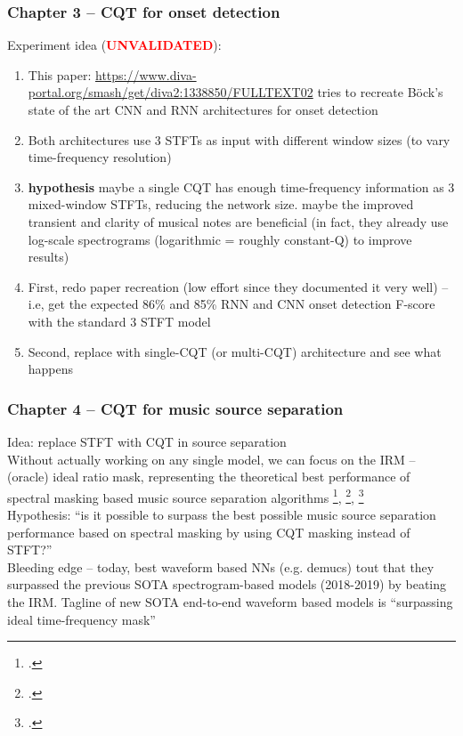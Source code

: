 \documentclass[usenames,dvipsnames]{beamer}
\begin{document}
\begin{frame}
	\frametitle{Chapter 3 -- CQT for onset detection}
	Experiment idea (\textcolor{red}{\textbf{UNVALIDATED}}):
	\begin{enumerate}
		\item
			This paper: \href{https://www.diva-portal.org/smash/get/diva2:1338850/FULLTEXT02}{https://www.diva-portal.org/smash/get/diva2:1338850/FULLTEXT02} tries to recreate B{\"o}ck's state of the art CNN and RNN architectures for onset detection
		\item
			Both architectures use 3 STFTs as input with different window sizes (to vary time-frequency resolution)
		\item
			\textbf{hypothesis} maybe a single CQT has enough time-frequency information as 3 mixed-window STFTs, reducing the network size. maybe the improved transient and clarity of musical notes are beneficial (in fact, they already use log-scale spectrograms (logarithmic = roughly constant-Q) to improve results)
		\item
			First, redo paper recreation (low effort since they documented it very well) -- i.e, get the expected 86\% and 85\% RNN and CNN onset detection F-score with the standard 3 STFT model
		\item
			Second, replace with single-CQT (or multi-CQT) architecture and see what happens
	\end{enumerate}
\end{frame}

\begin{frame}
	\frametitle{Chapter 4 -- CQT for music source separation}
	Idea: replace STFT with CQT in source separation\\
	\vspace{0.5em}
	Without actually working on any single model, we can focus on the IRM -- (oracle) ideal ratio mask, representing the theoretical  best performance of spectral masking based music source separation algorithms \footcite{irm}, \footcite{sigsep2018}, \footcite{vincent07}\\
	\vspace{0.5em}
	Hypothesis: ``is it possible to surpass the best possible music source separation performance based on spectral masking by using CQT masking instead of STFT?''\\
	\vspace{0.5em}
	Bleeding edge -- today, best waveform based NNs (e.g. demucs) tout that they surpassed the previous SOTA spectrogram-based models (2018-2019) by beating the IRM. Tagline of new SOTA end-to-end waveform based models is ``surpassing ideal time-frequency mask''
\end{frame}
\end{document}
